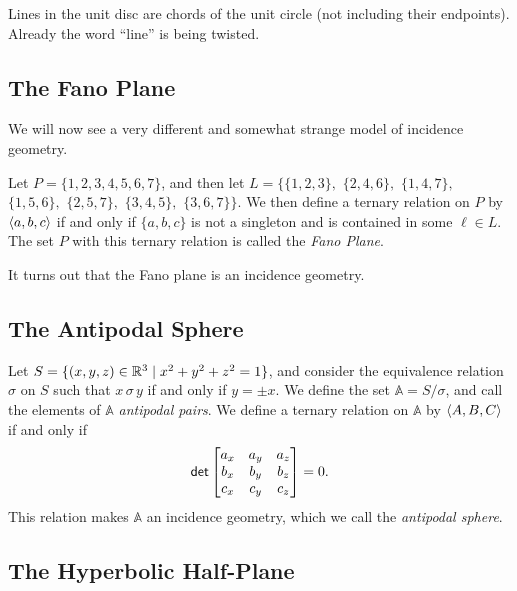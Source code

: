 Lines in the unit disc are chords of the unit circle (not including their endpoints).
Already the word ``line'' is being twisted.



\subsection{The Fano Plane}

We will now see a very different and somewhat strange model of incidence geometry.

\begin{dfn}
Let \(P = \{1,2,3,4,5,6,7\}\), and then let \(L = \{\{1,2,3\},\) \(\{2,4,6\},\) \(\{1,4,7\},\) \(\{1,5,6\},\) \(\{2,5,7\},\) \(\{3,4,5\},\) \(\{3,6,7\}\}\).
We then define a ternary relation on \(P\) by \(\langle a, b, c \rangle\) if and only if \(\{a,b,c\}\) is not a singleton and is contained in some \(\ell \in L\).
The set \(P\) with this ternary relation is called the \emph{Fano Plane}.
\end{dfn}

It turns out that the Fano plane is an incidence geometry.



\subsection{The Antipodal Sphere}

\begin{dfn}
Let \(S = \{ (x,y,z) \in \mathbb{R}^3 \mid x^2 + y^2 + z^2 = 1 \}\), and consider the equivalence relation \(\sigma\) on \(S\) such that \(x \,\sigma\, y\) if and only if \(y = \pm x\).
We define the set \(\mathbb{A} = S/\sigma\), and call the elements of \(\mathbb{A}\) \emph{antipodal pairs}.
We define a ternary relation on \(\mathbb{A}\) by \(\langle A, B, C \rangle\) if and only if \[ \mathsf{det} \begin{bmatrix} a_x & a_y & a_z \\ b_x & b_y & b_z \\ c_x & c_y & c_z \end{bmatrix} = 0. \] This relation makes \(\mathbb{A}\) an incidence geometry, which we call the \emph{antipodal sphere}.
\end{dfn}



\subsection{The Hyperbolic Half-Plane}

